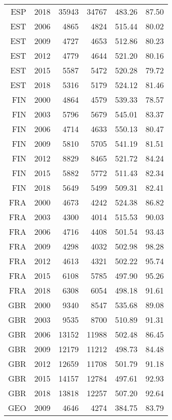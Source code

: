 \begin{longtable}{|r|r|r|r|r|r|}
    ESP   & 2018  & 35943 & 34767 & 483.26 & 87.50 \\
    EST   & 2006  & 4865  & 4824  & 515.44 & 80.02 \\
    EST   & 2009  & 4727  & 4653  & 512.86 & 80.23 \\
    EST   & 2012  & 4779  & 4644  & 521.20 & 80.16 \\
    EST   & 2015  & 5587  & 5472  & 520.28 & 79.72 \\
    EST   & 2018  & 5316  & 5179  & 524.12 & 81.46 \\
    FIN   & 2000  & 4864  & 4579  & 539.33 & 78.57 \\
    FIN   & 2003  & 5796  & 5679  & 545.01 & 83.37 \\
    FIN   & 2006  & 4714  & 4633  & 550.13 & 80.47 \\
    FIN   & 2009  & 5810  & 5705  & 541.19 & 81.51 \\
    FIN   & 2012  & 8829  & 8465  & 521.72 & 84.24 \\
    FIN   & 2015  & 5882  & 5772  & 511.43 & 82.34 \\
    FIN   & 2018  & 5649  & 5499  & 509.31 & 82.41 \\
    FRA   & 2000  & 4673  & 4242  & 524.38 & 86.82 \\
    FRA   & 2003  & 4300  & 4014  & 515.53 & 90.03 \\
    FRA   & 2006  & 4716  & 4408  & 501.54 & 93.43 \\
    FRA   & 2009  & 4298  & 4032  & 502.98 & 98.28 \\
    FRA   & 2012  & 4613  & 4321  & 502.22 & 95.74 \\
    FRA   & 2015  & 6108  & 5785  & 497.90 & 95.26 \\
    FRA   & 2018  & 6308  & 6054  & 498.18 & 91.61 \\
    GBR   & 2000  & 9340  & 8547  & 535.68 & 89.08 \\
    GBR   & 2003  & 9535  & 8700  & 510.89 & 91.31 \\
    GBR   & 2006  & 13152 & 11988 & 502.48 & 86.45 \\
    GBR   & 2009  & 12179 & 11212 & 498.73 & 84.48 \\
    GBR   & 2012  & 12659 & 11708 & 501.79 & 91.18 \\
    GBR   & 2015  & 14157 & 12784 & 497.61 & 92.93 \\
    GBR   & 2018  & 13818 & 12257 & 507.20 & 92.64 \\
    GEO   & 2009  & 4646  & 4274  & 384.75 & 83.79 \\

\end{longtable}
